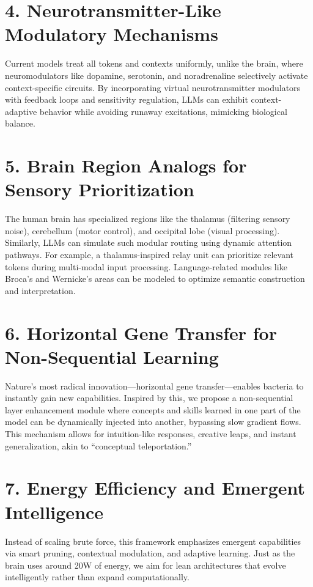 \documentclass[11pt]{article}
\begin{document}
\section{4. Neurotransmitter-Like Modulatory Mechanisms}
Current models treat all tokens and contexts uniformly, unlike the brain, where neuromodulators like dopamine, serotonin, and noradrenaline selectively activate context-specific circuits. By incorporating virtual neurotransmitter modulators with feedback loops and sensitivity regulation, LLMs can exhibit context-adaptive behavior while avoiding runaway excitations, mimicking biological balance.

\section{5. Brain Region Analogs for Sensory Prioritization}
The human brain has specialized regions like the thalamus (filtering sensory noise), cerebellum (motor control), and occipital lobe (visual processing). Similarly, LLMs can simulate such modular routing using dynamic attention pathways. For example, a thalamus-inspired relay unit can prioritize relevant tokens during multi-modal input processing. Language-related modules like Broca's and Wernicke’s areas can be modeled to optimize semantic construction and interpretation.

\section{6. Horizontal Gene Transfer for Non-Sequential Learning}
Nature's most radical innovation—horizontal gene transfer—enables bacteria to instantly gain new capabilities. Inspired by this, we propose a non-sequential layer enhancement module where concepts and skills learned in one part of the model can be dynamically injected into another, bypassing slow gradient flows. This mechanism allows for intuition-like responses, creative leaps, and instant generalization, akin to “conceptual teleportation.”

\section{7. Energy Efficiency and Emergent Intelligence}
Instead of scaling brute force, this framework emphasizes emergent capabilities via smart pruning, contextual modulation, and adaptive learning. Just as the brain uses around 20W of energy, we aim for lean architectures that evolve intelligently rather than expand computationally.
\end{document}
